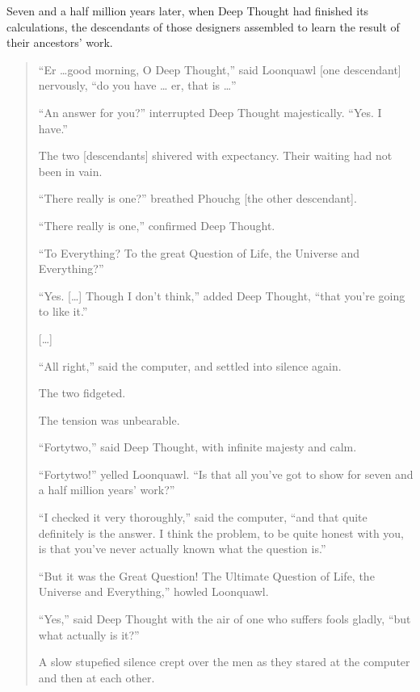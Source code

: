 \documentclass[letterpaper,10pt,english]{jupyterBook}
\begin{document}
\sphinxAtStartPar
Seven and a half million years later, when Deep Thought had  finished its calculations, the descendants of those designers assembled to learn the result of their ancestors’ work.
\begin{quote}

\sphinxAtStartPar
“Er …good morning, O Deep Thought,” said Loonquawl {[}one descendant{]} nervously, “do you have … er, that is …”

\sphinxAtStartPar
“An answer for you?” interrupted Deep Thought majestically. “Yes. I have.”

\sphinxAtStartPar
The two {[}descendants{]} shivered with expectancy. Their waiting had not been in vain.

\sphinxAtStartPar
“There really is one?” breathed Phouchg {[}the other descendant{]}.

\sphinxAtStartPar
“There really is one,” confirmed Deep Thought.

\sphinxAtStartPar
“To Everything? To the great Question of Life, the Universe and Everything?”

\sphinxAtStartPar
“Yes. {[}…{]} Though I don’t think,” added Deep Thought, “that you’re going to like it.”

\sphinxAtStartPar
{[}…{]}

\sphinxAtStartPar
“All right,” said the computer, and settled into silence again.

\sphinxAtStartPar
The two fidgeted.

\sphinxAtStartPar
The tension was unbearable.

\sphinxAtStartPar
“Forty\sphinxhyphen{}two,” said Deep Thought, with infinite majesty and calm.

\sphinxAtStartPar
“Forty\sphinxhyphen{}two!” yelled Loonquawl. “Is that all you’ve got to show for seven and a half million years’ work?”

\sphinxAtStartPar
“I checked it very thoroughly,” said the computer, “and that quite definitely is the answer. I think the problem, to be quite honest with you, is that you’ve never actually known what the question is.”

\sphinxAtStartPar
“But it was the Great Question! The Ultimate Question of Life, the Universe and Everything,” howled Loonquawl.

\sphinxAtStartPar
“Yes,” said Deep Thought with the air of one who suffers fools gladly, “but what actually is it?”

\sphinxAtStartPar
A slow stupefied silence crept over the men as they stared at the computer and then at each other.


\end{quote}
\end{document}
